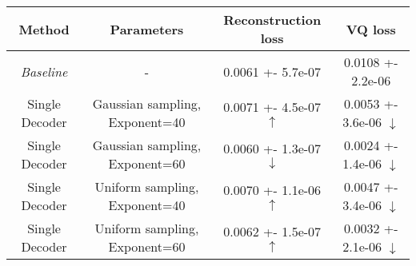 \centering
\scriptsize
\begin{tabular}{||c|c|c|c||}
\hline
 Method & Parameters & Reconstruction loss & VQ loss \\
\hline
\textit{Baseline} & - & 0.0061 +- 5.7e-07 & 0.0108 +- 2.2e-06 \\
\hline
Single Decoder & Gaussian sampling, Exponent=40 & 0.0071 +- 4.5e-07  $\uparrow$ & 0.0053 +- 3.6e-06  $\downarrow$ \\
\hline
Single Decoder & Gaussian sampling, Exponent=60 & 0.0060 +- 1.3e-07  $\downarrow$ & 0.0024 +- 1.4e-06  $\downarrow$ \\
\hline
Single Decoder & Uniform sampling, Exponent=40 & 0.0070 +- 1.1e-06  $\uparrow$ & 0.0047 +- 3.4e-06  $\downarrow$ \\
\hline
Single Decoder & Uniform sampling, Exponent=60 & 0.0062 +- 1.5e-07  $\uparrow$ & 0.0032 +- 2.1e-06  $\downarrow$ \\
\hline
\end{tabular}

